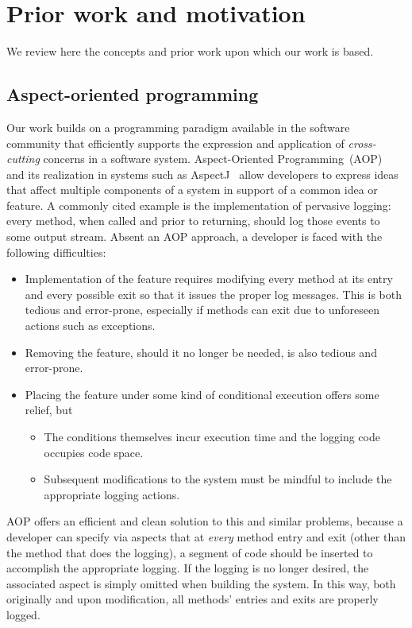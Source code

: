\documentclass[conference]{IEEEtran}
\begin{document}
\section{Prior work and motivation}\label{sec:prior}

We review here the concepts and prior work upon which our work is based.
\subsection{Aspect-oriented programming}

Our work builds on a programming paradigm available in the software community that efficiently supports the expression and application of \emph{cross-cutting} concerns in a software system.  Aspect-Oriented Programming~(AOP)~\cite{gregor:97} and its realization in systems such as AspectJ~\cite{aspectj} allow developers to express ideas that affect multiple components of a system in support of a common idea or feature. A commonly cited example is the implementation of pervasive logging: every method, when called and prior to returning, should log those events to some output stream. Absent an AOP approach, a developer is faced with the following difficulties:
\begin{itemize}
    \item Implementation of the feature requires modifying every method at its entry and every possible exit so that it issues the proper log messages.  This is both tedious and error-prone, especially if methods can exit due to unforeseen actions such as exceptions.
    \item Removing the feature, should it no longer be needed, is also tedious and error-prone.
    \item Placing the feature under some kind of conditional execution offers some relief, but
    \begin{itemize}
        \item The conditions themselves incur execution time and the logging code occupies code space.
        \item Subsequent modifications to the system must be mindful to include the appropriate logging actions.
    \end{itemize}
\end{itemize}
AOP offers an efficient and clean solution to this and similar problems, because a developer can specify via aspects that at \emph{every} method entry and exit (other than the method that does the logging), a segment of code should be inserted to accomplish the appropriate logging.  If the logging is no longer desired, the associated aspect is simply omitted when building the system.  In this way, both originally and upon modification, all methods' entries and exits are properly logged.
\end{document}

